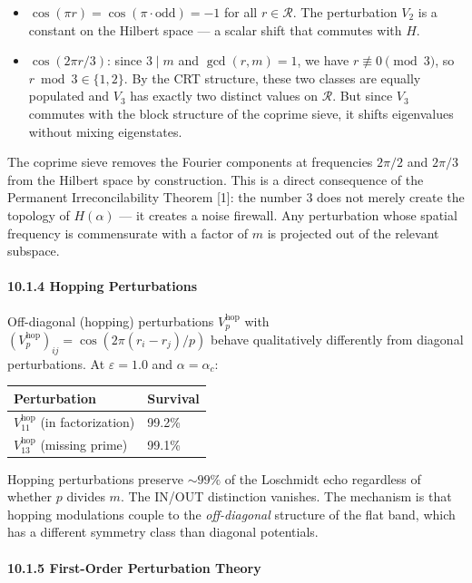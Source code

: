 \documentclass[11pt,letterpaper]{article}
\theoremstyle{definition}
\theoremstyle{remark}
\begin{document}
\begin{itemize}
\item
  $\cos(\pi r) = \cos(\pi \cdot \text{odd}) = -1$ for all $r \in \mathcal{R}$. The perturbation $V_2$ is a constant on the Hilbert space --- a scalar shift that commutes with $H$.
\item
  $\cos(2\pi r / 3)$: since $3 \mid m$ and $\gcd(r, m) = 1$, we have $r \not\equiv 0 \pmod{3}$, so $r \bmod 3 \in \{1, 2\}$. By the CRT structure, these two classes are equally populated and $V_3$ has exactly two distinct values on $\mathcal{R}$. But since $V_3$ commutes with the block structure of the coprime sieve, it shifts eigenvalues without mixing eigenstates.
\end{itemize}

The coprime sieve removes the Fourier components at frequencies $2\pi/2$ and $2\pi/3$ from the Hilbert space by construction. This is a direct consequence of the Permanent Irreconcilability Theorem [1]: the number 3 does not merely create the topology of $H(\alpha)$ --- it creates a noise firewall. Any perturbation whose spatial frequency is commensurate with a factor of $m$ is projected out of the relevant subspace.

\paragraph{10.1.4 Hopping Perturbations}\label{hopping-perturbations}

Off-diagonal (hopping) perturbations $V_p^{\text{hop}}$ with $(V_p^{\text{hop}})_{ij} = \cos(2\pi(r_i - r_j)/p)$ behave qualitatively differently from diagonal perturbations. At $\varepsilon = 1.0$ and $\alpha = \alpha_c$:

\begin{longtable}[]{@{}ll@{}}
\toprule
Perturbation & Survival \\
\midrule
\endhead
\bottomrule
$V_{11}^{\text{hop}}$ (in factorization) & 99.2\% \\
$V_{13}^{\text{hop}}$ (missing prime) & 99.1\% \\
\end{longtable}

Hopping perturbations preserve $\sim 99\%$ of the Loschmidt echo regardless of whether $p$ divides $m$. The IN/OUT distinction vanishes. The mechanism is that hopping modulations couple to the \emph{off-diagonal} structure of the flat band, which has a different symmetry class than diagonal potentials.

\paragraph{10.1.5 First-Order Perturbation Theory}\label{first-order-perturbation-theory}
\end{document}
